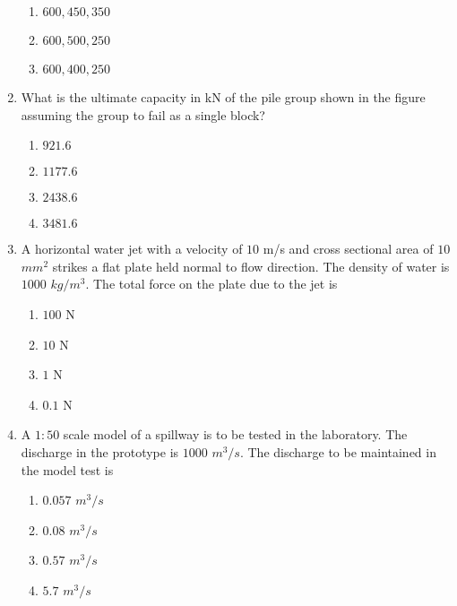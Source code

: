 \documentclass[journal,12pt,onecolumn]{IEEEtran}
\theoremstyle{remark}
\begin{document}
\begin{enumerate}[start=35]
\begin{enumerate}
			  \item $600,450,350$
			  \item $600,500,250$
			  \item $600,400,250$\\
		  \end{enumerate}
	  \item What is the ultimate capacity in kN of the pile group shown in the figure assuming the group to fail as a single block?\\
\begin{figure}[H]
    \centering
\end{figure}	
                  \begin{enumerate}
			  \item $921.6$
			  \item $1177.6$
			  \item $2438.6$
			  \item $3481.6$\\
		  \end{enumerate}
	  \item A horizontal water jet with a velocity of $10$ m/s and cross sectional area of $10$ $mm^2$ strikes a flat plate held normal to flow direction. The density of water is $1000$ $kg/m^3$. The total force on the plate due to the jet is
		  \begin{enumerate}
			  \item $100$ N
			  \item $10$ N
			  \item $1$ N
			  \item $0.1$ N\\
		  \end{enumerate}
	  \item A $1:50$ scale model of a spillway is to be tested in the laboratory. The discharge in the prototype is $1000$ $m^3/s$. The discharge to be maintained in the model test is
		  \begin{enumerate}
			  \item $0.057$ $m^3/s$
			  \item $0.08$ $m^3/s$
			  \item $0.57$ $m^3/s$
			  \item $5.7$ $m^3/s$
		  \end{enumerate}




\end{enumerate}
\end{document}
